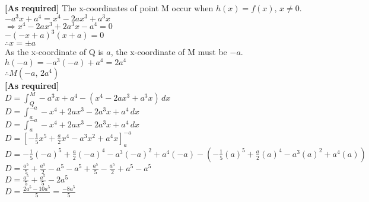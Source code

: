 \documentclass{homework}
\begin{document}
\begin{flushleft}
\begin{paracol}{2}
    \hspace{13em} \textbf{[As required]} \switchcolumn
    The x-coordinates of point M occur when $h(x)=f(x), \, x\neq 0.$ \vspace{0.5em}\\
    $-a^3x+a^4=x^4-2ax^3+a^3x$ \vspace{0.5em} \\
    $\Rightarrow x^4-2ax^3+2a^3x-a^4=0$ \vspace{0.5em}\\
    $-(-x+a)^3(x+a)=0$ \vspace{0.5em} \\
    $\therefore x=\pm a$ \vspace{1.5em}\\
    As the x-coordinate of Q is $a$, the x-coordinate of M must be $-a$. \vspace{0.5em} \\
    $h(-a)=-a^3(-a)+a^4=2a^4$ \vspace{0.5em}\\
    $\therefore M(-a, \,2a^4)$ \vspace{0.5em}\\
    \hspace{13em} \textbf{[As required]}
    \vspace{1em} \\
    $D=\int_Q^M -a^3x+a^4-(x^4-2ax^3+a^3x)\, dx $ \vspace{0.5em} \\ $D=\int_a^{-a} -x^4+2ax^3-2a^3x+a^4\, dx $ \vspace{0.5em} \\
    $D=\int_a^{-a} -x^4+2ax^3-2a^3x+a^4\, dx $ \vspace{0.5em} \\
    $D=[-\frac{1}{5}x^5+\frac{a}{2}x^4-a^3x^2+a^4x]_a^{-a}$ \vspace{0.5em} \\
    $D=-\frac{1}{5}(-a)^5+\frac{a}{2}(-a)^4-a^3(-a)^2+a^4(-a)-(-\frac{1}{5}(a)^5+\frac{a}{2}(a)^4-a^3(a)^2+a^4(a))$ \vspace{0.5em} \\
    $D=\frac{a^5}{5}+\frac{a^5}{2}-a^5-a^5+\frac{a^5}{5}-\frac{a^5}{2}+a^5-a^5$ \vspace{0.5em} \\
    $D=\frac{a^5}{5}+\frac{a^5}{5}-2a^5$ \vspace{0.5em} \\
    $D=\frac{2a^5-10a^5}{5}=\frac{-8a^5}{5}$ \vspace{0.5em} \\

\end{paracol}
\end{flushleft}
\end{document}
